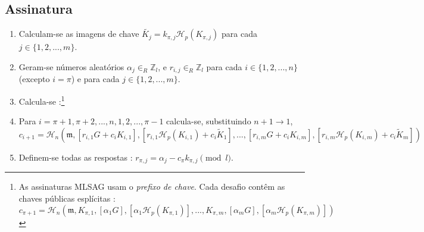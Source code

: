 \begin{description}

\subsection*{Assinatura}

\begin{enumerate}
	\item Calculam-se as imagens de chave \(\tilde{K_j} = k_{\pi, j} \mathcal{H}_p(K_{\pi, j})\) para cada \(j \in \{1, 2, ..., m\}\).

	\item Geram-se números aleatórios \(\alpha_j \in_R \mathbb{Z}_l\), e \(r_{i, j} \in_R \mathbb{Z}_l\) para cada \(i \in \{1, 2, ..., n\}\) (excepto \(i = \pi\)) e para cada \(j \in \{1, 2, ..., m\}\).

	\item Calcula-se :\footnote{As assinaturas MLSAG usam o {\em prefixo de chave}. Cada desafio contêm as chaves públicas esplícitas :
\vspace{-.25cm}
	\[c_{\pi+1} = \mathcal{H}_n(\mathfrak{m}, K_{\pi, 1}, [\alpha_1 G], [\alpha_1 \mathcal{H}_p(K_{\pi, 1})], ..., K_{\pi, m}, [\alpha_m G], [\alpha_m \mathcal{H}_p(K_{\pi, m})])
	\]}
	

	\item Para \(i = \pi+1, \pi+2, ..., n, 1, 2, ..., \pi-1\) calcula-se, substituindo \(n + 1 \rightarrow 1\),\vspace{.175cm}
	\[ c_{i+1} = \mathcal{H}_n(\mathfrak{m}, [r_{i, 1} G + c_i K_{i, 1}], [r_{i, 1} \mathcal{H}_p(K_{i, 1}) + c_i \tilde{K}_1], 
	..., [r_{i, m} G + c_i K_{i, m}], [r_{i, m} \mathcal{H}_p(K_{i, m}) + c_i \tilde{K}_m])\]

	\item Definem-se todas as respostas : \(r_{\pi, j} = \alpha_j - c_\pi k_{\pi, j} \pmod l\).
\end{enumerate}


\end{description}

